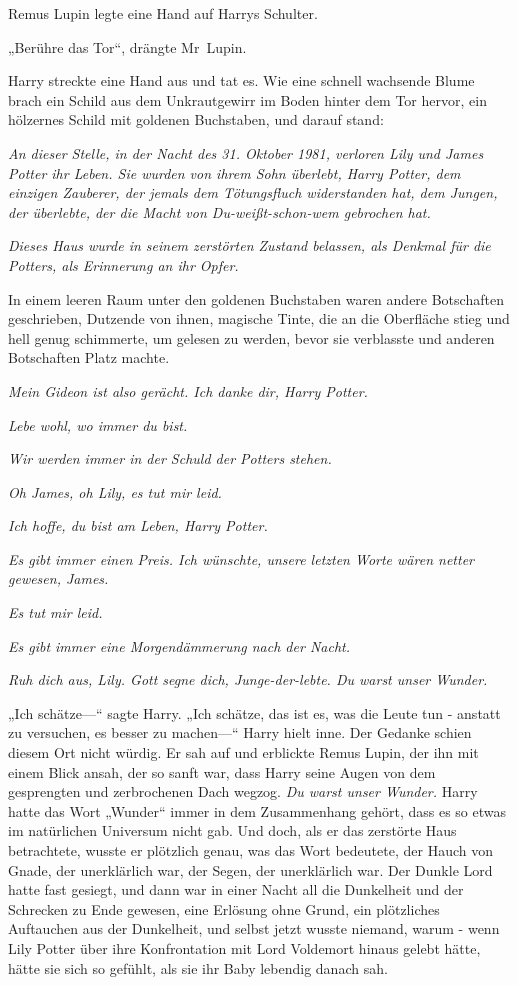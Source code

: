 {Remus Lupin legte eine Hand auf Harrys Schulter.

„Berühre das Tor“, drängte Mr~Lupin.

Harry streckte eine Hand aus und tat es. Wie eine schnell wachsende Blume brach ein Schild aus dem Unkrautgewirr im Boden hinter dem Tor hervor, ein hölzernes Schild mit goldenen Buchstaben, und darauf stand:

\emph{An dieser Stelle, in der Nacht des 31. Oktober 1981, verloren Lily und James Potter ihr Leben. Sie wurden von ihrem Sohn überlebt, Harry Potter, dem einzigen Zauberer, der jemals dem Tötungsfluch widerstanden hat, dem Jungen, der überlebte, der die Macht von Du-weißt-schon-wem gebrochen hat.}

\emph{Dieses Haus wurde in seinem zerstörten Zustand belassen, als Denkmal für die Potters, als Erinnerung an ihr Opfer.}

In einem leeren Raum unter den goldenen Buchstaben waren andere Botschaften geschrieben, Dutzende von ihnen, magische Tinte, die an die Oberfläche stieg und hell genug schimmerte, um gelesen zu werden, bevor sie verblasste und anderen Botschaften Platz machte.

\emph{Mein Gideon ist also gerächt. Ich danke dir, Harry Potter.}

\emph{Lebe wohl, wo immer du bist.}

\emph{Wir werden immer in der Schuld der Potters stehen.}

\emph{Oh James, oh Lily, es tut mir leid.}

\emph{Ich hoffe, du bist am Leben, Harry Potter.}

\strut

\emph{Es gibt immer einen Preis. Ich wünschte, unsere letzten Worte wären netter gewesen, James.}

\emph{Es tut mir leid.}

\emph{Es gibt immer eine Morgendämmerung nach der Nacht.}

\emph{Ruh dich aus, Lily. Gott segne dich, Junge-der-lebte. Du warst unser Wunder.}

„Ich schätze—“ sagte Harry. „Ich schätze, das ist es, was die Leute tun - anstatt zu versuchen, es besser zu machen—“ Harry hielt inne. Der Gedanke schien diesem Ort nicht würdig. Er sah auf und erblickte Remus Lupin, der ihn mit einem Blick ansah, der so sanft war, dass Harry seine Augen von dem gesprengten und zerbrochenen Dach wegzog. \emph{Du warst unser Wunder.} Harry hatte das Wort „Wunder“ immer in dem Zusammenhang gehört, dass es so etwas im natürlichen Universum nicht gab. Und doch, als er das zerstörte Haus betrachtete, wusste er plötzlich genau, was das Wort bedeutete, der Hauch von Gnade, der unerklärlich war, der Segen, der unerklärlich war. Der Dunkle Lord hatte fast gesiegt, und dann war in einer Nacht all die Dunkelheit und der Schrecken zu Ende gewesen, eine Erlösung ohne Grund, ein plötzliches Auftauchen aus der Dunkelheit, und selbst jetzt wusste niemand, warum - wenn Lily Potter über ihre Konfrontation mit Lord Voldemort hinaus gelebt hätte, hätte sie sich so gefühlt, als sie ihr Baby lebendig danach sah.

}
